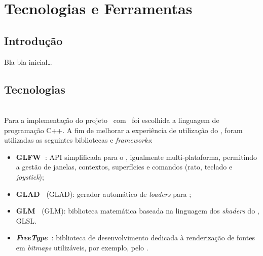 \chapter{Tecnologias e Ferramentas}
\label{ch::tecno}

\section{Introdução}
\label{sec::tecno:intro}

Bla bla inicial\ldots


\section{Tecnologias}
\label{sec::tecno:tecno}

\\

Para a implementação do projeto \theapp~com \opengl~foi escolhida a linguagem de programação C++. A fim de melhorar a experiência de utilização do \opengl, foram utilizadas as seguintes bibliotecas e \textit{frameworks}:

\begin{itemize}
    
    \item \textbf{GLFW~\cite{glfw}}: \ac{API} simplificada para o \opengl, igualmente multi-plataforma, permitindo a gestão de janelas, contextos, superfícies e comandos (rato, teclado e \textit{joystick});
    
    \item \textbf{\acs{GLAD}~\cite{glad,glad-webservice}} (\acl{GLAD}): gerador automático de \textit{loaders} para \opengl;
    
    \item \textbf{\acs{GLM}~\cite{glm}} (\acl{GLM}): biblioteca matemática baseada na linguagem dos \textit{shaders} do \opengl, \ac{GLSL}.
    
    \item \textbf{\textit{FreeType}~\cite{freetype}}: biblioteca de desenvolvimento dedicada à renderização de fontes em \textit{bitmaps} utilizáveis, por exemplo, pelo \opengl.
    
    
\end{itemize}

